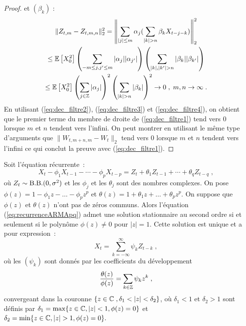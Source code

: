 \begin{proof}
et $(\beta_k)$ :
\begin{multline}\label{eq:dec_filtre4}
\|Z_{t,m}-Z_{t,m,n}\|_2^2=\left\|\sum_{|j|\leq
  m}\alpha_j(\sum_{|k|>n}\beta_k X_{t-j-k})\right\|_2^2\\
\leq \PE{X_0^2}\left(\sum_{-m\leq j,j'\leq m}|\alpha_j| |\alpha_{j'}|\right)
\left(\sum_{|k|,|k'|>n} |\beta_k||\beta_{k'}|\right)\\
\leq \PE{X_0^2} \left(\sum_{j\in\Zset}|\alpha_j|\right)^2
\left(\sum_{|k|>n}|\beta_k|\right)^2\to 0\;,\; m,n\to\infty\;.
\end{multline}
En utilisant (\ref{eq:dec_filtre2}), (\ref{eq:dec_filtre3}) et
(\ref{eq:dec_filtre4}), on obtient que le premier terme du membre de
droite de (\ref{eq:dec_filtre1}) tend vers 0 lorsque $m$ et $n$
tendent vers l'infini.
On peut montrer en utilisant le m\^{e}me type d'arguments que
$\|W_{t,m+n,m}-W_t\|_2$
tend vers 0 lorsque $m$ et $n$ tendent vers l'infini ce qui conclut la
preuve avec (\ref{eq:dec_filtre1}).

\end{proof}


\begin{theorem}
\label{theo:ARMApq} Soit l'\'equation r\'ecurrente~:
\begin{equation}
 \label{eq:recurrenceARMApq}
  X_t - \phi_1 X_{t-1} - \cdots - \phi_p X_{t-p}
  =
  Z_t + \theta_1 Z_{t-1} + \cdots + \theta_q Z_{t-q}\;,
\end{equation} o\`u $Z_t \sim \mathrm{B.B.}(0,\sigma^2)$ et les
$\phi_j$ et les $\theta_j$ sont des nombres complexes. On pose
$\phi(z)= 1 - \phi_1 z - \dots - \phi_p z^p$ et $\theta(z)= 1 +
\theta_1 z + \dots + \theta_p z^p$. On suppose que $\phi(z)$ et
$\theta(z)$ n'ont pas de z\'eros communs. Alors l'\'equation
(\ref{eq:recurrenceARMApq}) admet une solution stationnaire au
second ordre si et seulement si le polyn\^ome $\phi(z) \neq 0$ pour
$|z| = 1$. Cette solution est unique et a pour expression~:
\begin{equation}
 \label{eq:solutionARMApq}
 X_t = \sum_{k=-\infty}^{\infty} \psi_k Z_{t-k}\;,
\end{equation}
o\`u les $(\psi_k)$ sont donn\'es par les coefficients du d\'eveloppement
\begin{equation}\label{eq:dev_laurent_statio}
\frac{\theta(z)}{\phi(z)}=\sum_{k\in\mathbb{Z}}\psi_k z^k\;,
\end{equation}
convergeant dans la couronne $\left\{ z\in\cset \eqsp,  \delta_1<|z|<\delta_2 \right\}$, o\`u $\delta_1<1$
et $\delta_2>1$ sont d\'efinis par
$\delta_1=\max\{ z \in \mathbb{C}, | z | < 1, \phi(z) =0 \}$
et
$\delta_2=\min\{ z \in \mathbb{C}, |z| > 1, \phi(z) = 0 \}.$
\end{theorem}


